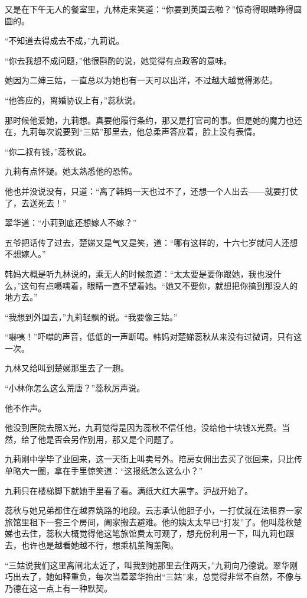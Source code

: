 \par 又是在下午无人的餐室里，九林走来笑道：“你要到英国去啦？”惊奇得眼睛睁得圆圆的。
\par “不知道去得成去不成，”九莉说。
\par “你去我想不成问题，”他很斟酌的说，她觉得有点政客的意味。
\par 她因为二婶三姑，一直总以为她也有一天可以出洋，不过越大越觉得渺茫。
\par “他答应的，离婚协议上有，”蕊秋说。
\par 那时候他爱她，九莉想。真要他履行条约，那又是打官司的事。但是她的魔力也还在，九莉每次说要到“三姑”那里去，他总柔声答应着，脸上没有表情。
\par “你二叔有钱，”蕊秋说。
\par 九莉有点怀疑。她太熟悉他的恐怖。
\par 他也并没说没有，只道：“离了韩妈一天也过不了，还想一个人出去——就要打仗了，去送死去！”
\par 翠华道：“小莉到底还想嫁人不嫁？”
\par 五爷把话传了过去，楚娣又是气又是笑，道：“哪有这样的，十六七岁就问人还想不想嫁人。”
\par 韩妈大概是听九林说的，乘无人的时候忽道：“太太要是要你跟她，我也没什么，”这句有点嗫嚅着，眼睛一直不望着她。“她又不要你，就想把你搞到那没人的地方去。”
\par “我想到外国去，”九莉轻飘的说。“我要像三姑。”
\par “嚇咦！”吓噤的声音，低低的一声断喝。韩妈对楚娣蕊秋从来没有过微词，只有这一次。
\par 九林又给叫到楚娣那里去了一趟。
\par “小林你怎么这么荒唐？”蕊秋厉声说。
\par 他不作声。
\par 他没到医院去照X光，九莉觉得是因为蕊秋不信任他，没给他十块钱X光费。当然，给了他是否会另作别用，那又是个问题了。
\par 九莉刚中学毕了业回来，这一天街上叫卖号外。陪房女佣出去买了张回来，只比传单略大一圈，拿在手里惊笑道：“这报纸怎么这么小？”
\par 九莉只在楼梯脚下就她手里看了看。满纸大红大黑字。沪战开始了。
\par 蕊秋与她兄弟都住在越界筑路的地段。云志承认他胆子小，一打仗就在法租界一家旅馆里租下一套三个房间，阖家搬去避难。他的姨太太早已“打发”了。他叫蕊秋楚娣也去住，蕊秋大概觉得他这笔旅馆费太可观了，想充份利用一下，叫九莉也跟去，也许也是越看她越不行，想乘机薰陶薰陶。
\par “三姑说我们这里离闸北太近了，叫我到她那里去住两天，”九莉向乃德说。翠华刚巧出去了，她如释重负，每次当着翠华抬出“三姑”来，总觉得非常不自然，不像与乃德在这一点上有一种默契。
